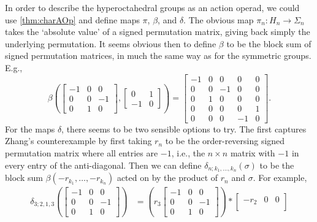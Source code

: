 \begin{example}
\begin{enumerate}
In order to describe the hyperoctahedral groups as an action operad, we could use \cref{thm:charAOp} and define maps $\pi$, $\beta$, and $\delta$. The obvious map $\pi_n \colon H_n \rightarrow \Sigma_n$ takes the `absolute value' of a signed permutation matrix, giving back simply the underlying permutation. It seems obvious then to define $\beta$ to be the block sum of signed permutation matrices, in much the same way as for the symmetric groups. E.g.,
  \[
    \beta\left(
      \begin{bmatrix}
      -1 & 0 & 0 \\
      0 & 0 & -1 \\
      0 & 1 & 0
      \end{bmatrix},
      \begin{bmatrix}
      0 & 1 \\
      -1 & 0
      \end{bmatrix}
    \right)
    =
    \begin{bmatrix}
      -1 &  0 &  0 &  0 & 0 \\
      0  &  0 & -1 &  0 & 0 \\
      0  &  1 &  0 &  0 & 0 \\
      0  &  0 &  0 &  0 & 1 \\
      0  &  0 &  0 & -1 & 0
    \end{bmatrix}.
  \]
For the maps $\delta$, there seems to be two sensible options to try. The first captures Zhang's counterexample by first taking $r_n$ to be the order-reversing signed permutation matrix where all entries are $-1$, i.e., the $n \times n$ matrix with $-1$ in every entry of the anti-diagonal. Then we can define $\delta_{n;k_1,\ldots,k_n}(\sigma)$ to be the block sum $\beta(-r_{k_1},\ldots,-r_{k_n})$ acted on by the product of $r_n$ and $\sigma$. For example,
  \begin{align*}
    \delta_{3;2,1,3}\left(
    \begin{bmatrix}
      -1 & 0 & 0 \\
      0 & 0 & -1 \\
      0 & 1 & 0
      \end{bmatrix}
      \right)
      &=
      \left(
      r_3
      \begin{bmatrix}
      -1 & 0 & 0 \\
      0 & 0 & -1 \\
      0 & 1 & 0
      \end{bmatrix}
      \right)
      \ast
      \begin{bmatrix}
      -r_2 & 0 & 0 \\

\end{bmatrix}
\end{align*}
\end{enumerate}
\end{example}
